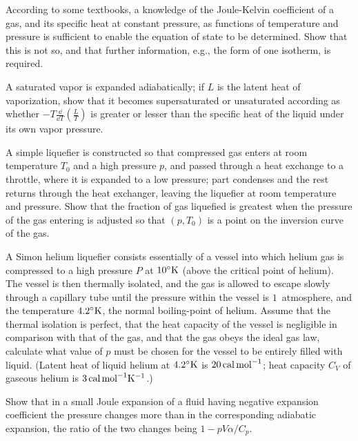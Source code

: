
\bigskip{}
According to some textbooks,
a knowledge of the Joule-Kelvin coefficient of a gas,
and its specific heat at constant pressure,
as functions of temperature and pressure is sufficient
to enable the equation of state to be determined.
Show that this is not so, and that
further information, e.g., the form of one isotherm, is required.

\bigskip{}
A saturated vapor is expanded adiabatically;
if $L$ is the latent heat of vaporization,
show that it becomes supersaturated or unsaturated according as whether
$-T \frac{\dd}{\dd T}\!\left(\frac{L}{T}\right)$
is greater or lesser than the specific heat
of the liquid under its own vapor pressure.

\bigskip{}
A simple liquefier is constructed so that compressed gas
enters at room temperature $T_0$ and a high pressure $p$,
and passed through a heat exchange to a throttle,
where it is expanded to a low pressure;
part condenses and the rest returns through the heat exchanger,
leaving the liquefier at room temperature and pressure.
Show that the fraction of gas liquefied is greatest when
the pressure of the gas entering is adjusted so that
$(p, T_0)$ is a point on the inversion curve of the gas.

\bigskip{}
A Simon helium liquefier consists essentially of a vessel
into which helium gas is compressed to a high pressure $P$ at $10^\circ{\rm K}$
(above the critical point of helium).
The vessel is then thermally isolated,
and the gas is allowed to escape slowly through a capillary tube
until the pressure within the vessel is $1$~atmosphere,
and the temperature $4.2^\circ{\rm K}$,
the normal boiling-point of helium.
Assume that the thermal isolation is perfect,
that the heat capacity of the vessel is negligible
in comparison with that of the gas,
and that the gas obeys the ideal gas law,
calculate what value of $p$ must be chosen
for the vessel to be entirely filled with liquid.
(Latent heat of liquid helium at $4.2^\circ{\rm K}$ is
$20\,{\rm cal\,mol}^{-1}$;
heat capacity $C_V$ of gaseous helium is
$3\,{\rm cal\,mol}^{-1}{\rm K}^{-1}$.)

\bigskip{}
Show that in a small Joule expansion of a fluid
having negative expansion coefficient
the pressure changes more than in the corresponding adiabatic expansion,
the ratio of the two changes being $1 - pV\alpha / C_p$.

